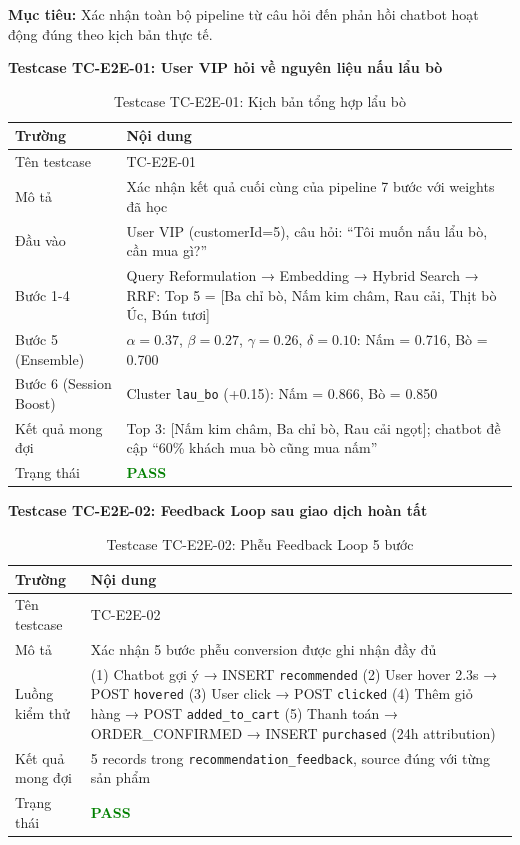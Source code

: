 \documentclass[12pt,a4paper]{report}
\begin{document}
\textbf{Mục tiêu:} Xác nhận toàn bộ pipeline từ câu hỏi đến phản hồi chatbot hoạt động đúng theo kịch bản thực tế.

\textbf{Testcase TC-E2E-01: User VIP hỏi về nguyên liệu nấu lẩu bò}

\begin{table}[htbp]
\centering
\renewcommand{\arraystretch}{1.3}
\begin{tabular}{|l|p{8cm}|}
\hline
\rowcolor[HTML]{EFEFEF}
\textbf{Trường} & \textbf{Nội dung} \\ \hline
Tên testcase & TC-E2E-01 \\ \hline
Mô tả & Xác nhận kết quả cuối cùng của pipeline 7 bước với weights đã học \\ \hline
Đầu vào & User VIP (customerId=5), câu hỏi: ``Tôi muốn nấu lẩu bò, cần mua gì?'' \\ \hline
Bước 1-4 & Query Reformulation → Embedding → Hybrid Search → RRF: Top 5 = [Ba chỉ bò, Nấm kim châm, Rau cải, Thịt bò Úc, Bún tươi] \\ \hline
Bước 5 (Ensemble) & $\alpha=0.37$, $\beta=0.27$, $\gamma=0.26$, $\delta=0.10$: Nấm = 0.716, Bò = 0.700 \\ \hline
Bước 6 (Session Boost) & Cluster \texttt{lau\_bo} (+0.15): Nấm = 0.866, Bò = 0.850 \\ \hline
Kết quả mong đợi & Top 3: [Nấm kim châm, Ba chỉ bò, Rau cải ngọt]; chatbot đề cập ``60\% khách mua bò cũng mua nấm'' \\ \hline
Trạng thái & \textcolor{green}{\textbf{PASS}} \\ \hline
\end{tabular}
\caption{Testcase TC-E2E-01: Kịch bản tổng hợp lẩu bò}
\end{table}

\textbf{Testcase TC-E2E-02: Feedback Loop sau giao dịch hoàn tất}

\begin{table}[htbp]
\centering
\renewcommand{\arraystretch}{1.3}
\begin{tabular}{|l|p{8cm}|}
\hline
\rowcolor[HTML]{EFEFEF}
\textbf{Trường} & \textbf{Nội dung} \\ \hline
Tên testcase & TC-E2E-02 \\ \hline
Mô tả & Xác nhận 5 bước phễu conversion được ghi nhận đầy đủ \\ \hline
Luồng kiểm thử & (1) Chatbot gợi ý → INSERT \texttt{recommended} \newline (2) User hover 2.3s → POST \texttt{hovered} \newline (3) User click → POST \texttt{clicked} \newline (4) Thêm giỏ hàng → POST \texttt{added\_to\_cart} \newline (5) Thanh toán → ORDER\_CONFIRMED → INSERT \texttt{purchased} (24h attribution) \\ \hline
Kết quả mong đợi & 5 records trong \texttt{recommendation\_feedback}, source đúng với từng sản phẩm \\ \hline
Trạng thái & \textcolor{green}{\textbf{PASS}} \\ \hline
\end{tabular}
\caption{Testcase TC-E2E-02: Phễu Feedback Loop 5 bước}
\end{table}
\end{document}
